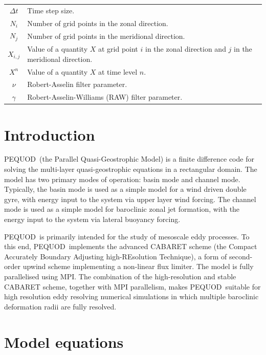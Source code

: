 \documentclass[a4paper]{book}
\newcommand{\pequod}{PEQUOD}
\newcommand{\pequodexpanded}{Parallel Quasi-Geostrophic Model}
\begin{document}
\begin{center}
\begin{longtable}{ | c | p{} | }
  $\Delta t$           & Time step size. \\
  $N_i$                & Number of grid points in the zonal direction. \\
  $N_j$                & Number of grid points in the meridional direction. \\
  $X_{i,j}$            & Value of a quantity $X$ at grid point $i$ in the
                         zonal direction and $j$ in the meridional direction. \\
  $X^n$                & Value of a quantity $X$ at time level $n$. \\
  $\nu$                & Robert-Asselin filter parameter. \\
  $\gamma$             & Robert-Asselin-Williams (RAW) filter parameter. \\
  \hline
\end{longtable}
\end{center}

\chapter{Introduction}

\pequod\ (the \pequodexpanded) is a finite difference code for
solving the multi-layer quasi-geostrophic equations in a rectangular domain. The
model has two primary modes of operation: basin mode and channel mode.
Typically, the basin mode is used as a simple model for a wind driven double
gyre, with energy input to the system via upper layer wind forcing. The channel
mode is used as a simple model for baroclinic zonal jet formation, with the
energy input to the system via lateral buoyancy forcing.

\pequod\ is primarily intended for the study of mesoscale eddy processes. To
this end, \pequod\ implements the advanced CABARET scheme (the Compact
Accurately Boundary Adjusting high-REsolution Technique), a form of second-order
upwind scheme implementing a non-linear flux limiter. The model is fully
parallelised using MPI. The combination of the high-resolution and stable
CABARET scheme, together with MPI parallelism, makes \pequod\ suitable for high
resolution eddy resolving numerical simulations in which multiple baroclinic
deformation radii are fully resolved.

\chapter{Model equations}
\end{document}
